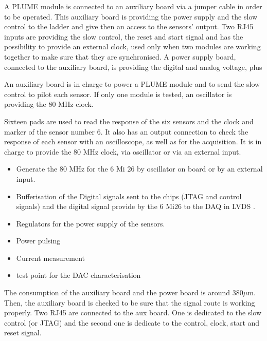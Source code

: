   A PLUME module is connected to an auxiliary board via a jumper cable in order to be operated.
  This auxiliary board is providing the power supply and the slow control to the ladder and give then an access to the sensors' output.
  Two RJ45 inputs are providing the slow control, the reset and start signal and has the possibility to provide an external clock, used only when two modules are working together to make sure that they are synchronised.
  A power supply board, connected to the auxiliary board, is providing the digital and analog voltage, plus 

  An auxiliary board is in charge to power a PLUME module and to send the slow control to pilot each sensor. 
  If only one module is tested, an oscillator is providing the 80 MHz clock.

  Sixteen pads are used to read the response of the six sensors and the clock and marker of the sensor number 6.
  It also has an output connection to check the response of each sensor with an oscilloscope, as well as for the acquisition.
  It is in charge to provide the 80 MHz clock, via oscillator or via an external input. 

  \begin{itemize}
    \item Generate the 80 MHz for the 6 Mi 26 by oscillator on board or by an external input.
    \item Bufferisation of the Digital signals sent to the chips (JTAG and control signals) and the digital signal provide by the 6 Mi26 to the DAQ in LVDS .
    \item Regulators for the power supply of the sensors.
    \item Power pulsing
    \item Current measurement
    \item test point for the DAC characterisation
  \end{itemize}

  The consumption of the auxiliary board and the power board is around $380 \mu\text{m}$.
  Then, the auxiliary board is checked to be sure that the signal route is working properly.
  Two RJ45 are connected to the aux board. One is dedicated to the slow control (or JTAG) and the second one is dedicate to the control, clock, start and reset signal.

  \begin{figure}
  \end{figure}

